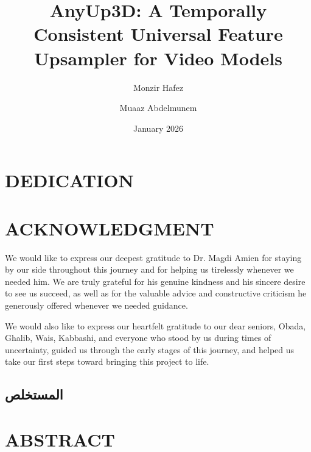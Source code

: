 \documentclass[12pt, a4paper]{report}
\title{AnyUp3D: A Temporally Consistent Universal Feature Upsampler for Video Models}
\author{Monzir Hafez \and Muaaz Abdelmunem}
\date{January 2026}
\begin{document}


\setcounter{page}{2} %

\chapter*{DEDICATION}




\chapter*{ACKNOWLEDGMENT}
\begin{center}
We would like to express our deepest gratitude to Dr. Magdi Amien for staying by our side throughout this journey and for helping us tirelessly whenever we needed him. We are truly grateful for his genuine kindness and his sincere desire to see us succeed, as well as for the valuable advice and constructive criticism he generously offered whenever we needed guidance.

We would also like to express our heartfelt gratitude to our dear seniors, Obada, Ghalib, Wais, Kabbashi, and everyone who stood by us during times of uncertainty, guided us through the early stages of this journey, and helped us take our first steps toward bringing this project to life.
\end{center}



\begingroup

\begin{Arabic}
\chapter*{المستخلص}
\justifying




\end{Arabic}


\endgroup

\chapter*{ABSTRACT}


\tableofcontents
{}
\end{document}
